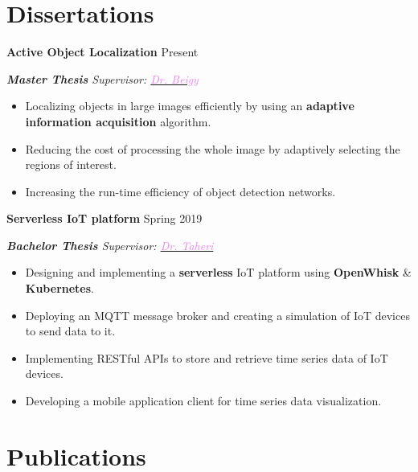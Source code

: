 \documentclass[11pt,a4paper,roman]{moderncv} %
\begin{document}
\section{Dissertations}

\textbf{Active Object Localization} \hfill Present
\begin{adjustwidth}{0.2in}{0in}
	\emph{\textbf{Master Thesis} \textendash Supervisor: \href{http://sharif.edu/~beigy}{\textcolor{violet}{Dr. Beigy}}}
	\begin{itemize}
		\item Localizing objects in large images efficiently by using an \textbf{adaptive information acquisition} algorithm.
		\item Reducing the cost of processing the whole image by adaptively selecting the regions of interest.
		\item Increasing the run-time efficiency of object detection networks.
	\end{itemize}
\end{adjustwidth}

\vspace{10pt}

\textbf{Serverless IoT platform} \hfill Spring 2019
\begin{adjustwidth}{0.2in}{0in}
	\emph{\textbf{Bachelor Thesis} \textendash Supervisor: \href{https://aut.ac.ir/cv/2222/HASSAN-TAHERI?slc_lang=en}{\textcolor{violet}{Dr. Taheri}}}
	\begin{itemize}
		\item Designing and implementing a \textbf{serverless} IoT platform using \textbf{OpenWhisk} \& \textbf{Kubernetes}.
		\item Deploying an MQTT message broker and creating a simulation of IoT devices to send data to it.
		\item Implementing RESTful APIs to store and retrieve time series data of IoT devices.
		\item Developing a mobile application client for time series data visualization.
	\end{itemize}
\end{adjustwidth}

\section{Publications}
\end{document}
